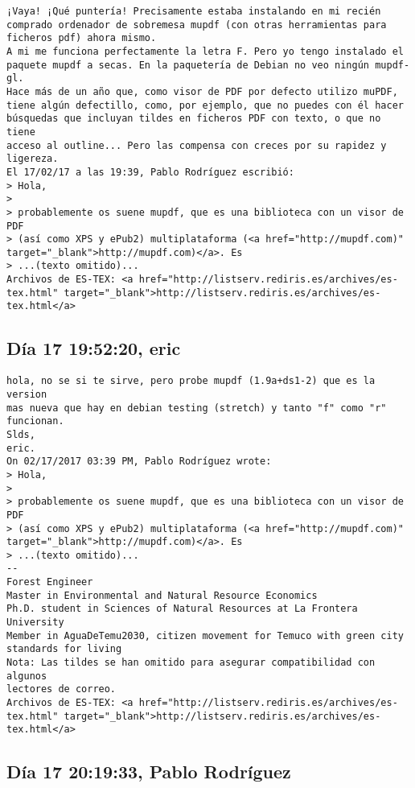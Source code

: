 \documentclass[a4paper,10pt]{article}
\begin{document}
\begin{lstlisting}
¡Vaya! ¡Qué puntería! Precisamente estaba instalando en mi recién 
comprado ordenador de sobremesa mupdf (con otras herramientas para 
ficheros pdf) ahora mismo.
A mi me funciona perfectamente la letra F. Pero yo tengo instalado el 
paquete mupdf a secas. En la paquetería de Debian no veo ningún mupdf-gl.
Hace más de un año que, como visor de PDF por defecto utilizo muPDF, 
tiene algún defectillo, como, por ejemplo, que no puedes con él hacer 
búsquedas que incluyan tildes en ficheros PDF con texto, o que no tiene 
acceso al outline... Pero las compensa con creces por su rapidez y ligereza.
El 17/02/17 a las 19:39, Pablo Rodríguez escribió:
> Hola,
>
> probablemente os suene mupdf, que es una biblioteca con un visor de PDF
> (así como XPS y ePub2) multiplataforma (<a href="http://mupdf.com)" target="_blank">http://mupdf.com)</a>. Es
> ...(texto omitido)...
Archivos de ES-TEX: <a href="http://listserv.rediris.es/archives/es-tex.html" target="_blank">http://listserv.rediris.es/archives/es-tex.html</a>

\end{lstlisting}

\subsection{Día 17 19:52:20, eric}

\begin{lstlisting}
hola, no se si te sirve, pero probe mupdf (1.9a+ds1-2) que es la version 
mas nueva que hay en debian testing (stretch) y tanto "f" como "r" 
funcionan.
Slds,
eric.
On 02/17/2017 03:39 PM, Pablo Rodríguez wrote:
> Hola,
>
> probablemente os suene mupdf, que es una biblioteca con un visor de PDF
> (así como XPS y ePub2) multiplataforma (<a href="http://mupdf.com)" target="_blank">http://mupdf.com)</a>. Es
> ...(texto omitido)...
-- 
Forest Engineer
Master in Environmental and Natural Resource Economics
Ph.D. student in Sciences of Natural Resources at La Frontera University
Member in AguaDeTemu2030, citizen movement for Temuco with green city 
standards for living
Nota: Las tildes se han omitido para asegurar compatibilidad con algunos 
lectores de correo.
Archivos de ES-TEX: <a href="http://listserv.rediris.es/archives/es-tex.html" target="_blank">http://listserv.rediris.es/archives/es-tex.html</a>

\end{lstlisting}

\subsection{Día 17 20:19:33, Pablo Rodríguez}
\end{document}
